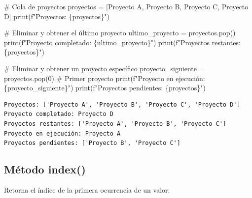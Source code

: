 \documentclass[
  doc,
  floatsintext,
  longtable,
  a4paper,
  nolmodern,
  notxfonts,
  notimes,
  12pt,
  colorlinks=true,linkcolor=blue,citecolor=blue,urlcolor=blue]{apa7}
\newenvironment{Shaded}{\begin{snugshade}}{\end{snugshade}}
\newcommand{\BuiltInTok}[1]{\textcolor[rgb]{0.00,0.23,0.31}{#1}}
\newcommand{\CommentTok}[1]{\textcolor[rgb]{0.37,0.37,0.37}{#1}}
\newcommand{\DecValTok}[1]{\textcolor[rgb]{0.68,0.00,0.00}{#1}}
\newcommand{\NormalTok}[1]{\textcolor[rgb]{0.00,0.23,0.31}{#1}}
\newcommand{\OperatorTok}[1]{\textcolor[rgb]{0.37,0.37,0.37}{#1}}
\newcommand{\SpecialCharTok}[1]{\textcolor[rgb]{0.37,0.37,0.37}{#1}}
\newcommand{\SpecialStringTok}[1]{\textcolor[rgb]{0.13,0.47,0.30}{#1}}
\newcommand{\StringTok}[1]{\textcolor[rgb]{0.13,0.47,0.30}{#1}}
\begin{document}
\begin{Shaded}
\begin{Highlighting}[]
\CommentTok{\# Cola de proyectos}
\NormalTok{proyectos }\OperatorTok{=}\NormalTok{ [}\StringTok{\textquotesingle{}Proyecto A\textquotesingle{}}\NormalTok{, }\StringTok{\textquotesingle{}Proyecto B\textquotesingle{}}\NormalTok{, }\StringTok{\textquotesingle{}Proyecto C\textquotesingle{}}\NormalTok{, }\StringTok{\textquotesingle{}Proyecto D\textquotesingle{}}\NormalTok{]}
\BuiltInTok{print}\NormalTok{(}\SpecialStringTok{f"Proyectos: }\SpecialCharTok{\{}\NormalTok{proyectos}\SpecialCharTok{\}}\SpecialStringTok{"}\NormalTok{)}

\CommentTok{\# Eliminar y obtener el último proyecto}
\NormalTok{ultimo\_proyecto }\OperatorTok{=}\NormalTok{ proyectos.pop()}
\BuiltInTok{print}\NormalTok{(}\SpecialStringTok{f"Proyecto completado: }\SpecialCharTok{\{}\NormalTok{ultimo\_proyecto}\SpecialCharTok{\}}\SpecialStringTok{"}\NormalTok{)}
\BuiltInTok{print}\NormalTok{(}\SpecialStringTok{f"Proyectos restantes: }\SpecialCharTok{\{}\NormalTok{proyectos}\SpecialCharTok{\}}\SpecialStringTok{"}\NormalTok{)}

\CommentTok{\# Eliminar y obtener un proyecto específico}
\NormalTok{proyecto\_siguiente }\OperatorTok{=}\NormalTok{ proyectos.pop(}\DecValTok{0}\NormalTok{)  }\CommentTok{\# Primer proyecto}
\BuiltInTok{print}\NormalTok{(}\SpecialStringTok{f"Proyecto en ejecución: }\SpecialCharTok{\{}\NormalTok{proyecto\_siguiente}\SpecialCharTok{\}}\SpecialStringTok{"}\NormalTok{)}
\BuiltInTok{print}\NormalTok{(}\SpecialStringTok{f"Proyectos pendientes: }\SpecialCharTok{\{}\NormalTok{proyectos}\SpecialCharTok{\}}\SpecialStringTok{"}\NormalTok{)}
\end{Highlighting}
\end{Shaded}

\begin{verbatim}
Proyectos: ['Proyecto A', 'Proyecto B', 'Proyecto C', 'Proyecto D']
Proyecto completado: Proyecto D
Proyectos restantes: ['Proyecto A', 'Proyecto B', 'Proyecto C']
Proyecto en ejecución: Proyecto A
Proyectos pendientes: ['Proyecto B', 'Proyecto C']
\end{verbatim}

\subsection{Método index()}\label{muxe9todo-index}

Retorna el índice de la primera ocurrencia de un valor:
\end{document}
